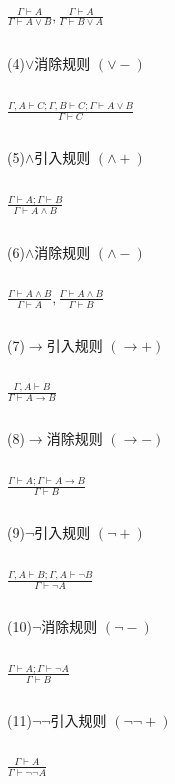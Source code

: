 \documentclass{article}
\begin{document}
\begin{CJK*}{UTF8}{gbsn}
    $\quad$

    {\LARGE$\frac{\Gamma \vdash A}{\Gamma\vdash A\lor B},\frac{\Gamma \vdash A}{\Gamma \vdash B\lor A}$
    }

    $\quad$

    (4)$\lor$消除规则 $(\lor -)$

    $\quad$

    {\LARGE$\frac{\Gamma,A \vdash C; \Gamma, B \vdash C; \Gamma \vdash A\lor B}{\Gamma \vdash C}$
    }

    $\quad$

    (5)$\land$引入规则 $(\land +)$

    $\quad$

    {\LARGE$\frac{\Gamma \vdash A;\Gamma \vdash B}{\Gamma \vdash A\land B}$
    }

    $\quad$

    (6)$\land$消除规则 $(\land -)$

    $\quad$

    {\LARGE$\frac{\Gamma \vdash A\land B}{\Gamma \vdash A},\frac{\Gamma \vdash A\land B}{\Gamma \vdash B}$
    }

    $\quad$
    
    (7)$\to$引入规则 $(\to +)$

    $\quad$

    {\LARGE$\frac{\Gamma,A\vdash B}{\Gamma \vdash A\to B}$
    }

    $\quad$

    (8)$\to$消除规则 $(\to -)$

    $\quad$

    {\LARGE$\frac{\Gamma \vdash A; \Gamma \vdash A\to B}{\Gamma\vdash B}$
    }

    $\quad$
    
    
    (9)$\lnot$引入规则 $(\lnot +)$

    $\quad$
    
    {\LARGE$\frac{\Gamma, A\vdash B; \Gamma, A\vdash \lnot B}{\Gamma \vdash \lnot A}$
    }

    $\quad$
    
    (10)$\lnot$消除规则 $(\lnot -)$

    $\quad$
    
    {\LARGE$\frac{\Gamma \vdash A; \Gamma \vdash \lnot A}{\Gamma \vdash B}$
    }

    $\quad$
    
    (11)$\lnot\lnot$引入规则 $(\lnot\lnot +)$

    $\quad$
   
    {\LARGE$\frac{\Gamma\vdash A}{\Gamma\vdash\lnot\lnot A}$
    }


\end{CJK*}
\end{document}
